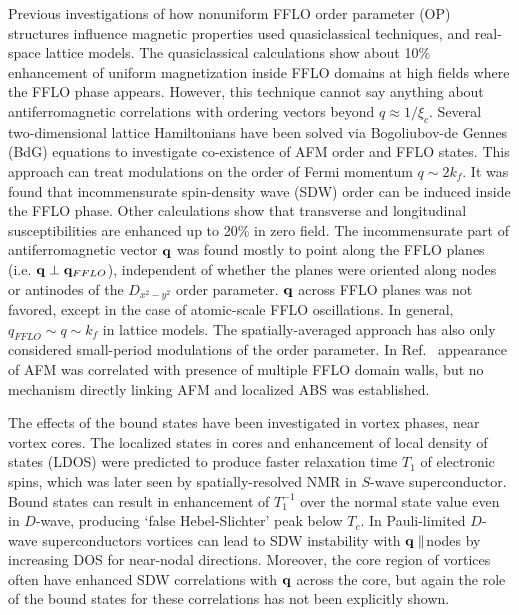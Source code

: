 \documentclass[prb,aps,showpacs,amsmath,twocolumn,10pt]{revtex4-1}
\begin{document}
Previous investigations of how nonuniform FFLO order parameter (OP) 
structures influence magnetic properties used quasiclassical techniques,
and real-space lattice models. 
The quasiclassical calculations\cite{Burkhardt1994,Vorontsov:2006fc} 
show about 10\% enhancement of uniform 
magnetization inside FFLO domains at high fields where the FFLO phase appears. 
However, this technique cannot say anything about antiferromagnetic correlations 
with ordering vectors beyond $q \approx 1/\xi_c$. 
Several two-dimensional lattice Hamiltonians have been solved via Bogoliubov-de Gennes (BdG) equations 
to investigate co-existence of AFM order and FFLO states.\cite{Yanase2009, Yanase2009abs, Marcin2009, Yanase2011} 
This approach can treat modulations on the order of Fermi momentum $q \sim 2k_f$. 
It was found that incommensurate spin-density wave (SDW) order
can be induced inside the FFLO phase.\cite{Yanase2009,Yanase2009abs} 
Other calculations show that transverse and longitudinal susceptibilities are enhanced up to 20\% in zero
field.\cite{Marcin2009}
The incommensurate part of antiferromagnetic vector ${\bf q}$ was found mostly to point along the FFLO
planes (i.e. ${\bf q} \perp {\bf q}_{FFLO}$),\cite{Yanase2009,Yanase2009abs} 
independent of whether the planes were oriented along nodes or
antinodes of the $D_{x^2-y^2}$ order parameter. 
${\bf q}$ across FFLO planes was not favored, except in the case of
atomic-scale {FFLO} oscillations.\cite{Marcin2009,Yanase2011}
In general, $q_{FFLO} \sim q \sim k_f$ in lattice models. 
The spatially-averaged approach\cite{Marcin2009} has also only considered
small-period modulations of the order parameter. 
In Ref.~ 
appearance of AFM was correlated with presence of multiple FFLO domain walls,
but no mechanism directly linking AFM and localized ABS was established. 

The effects of the bound states have been investigated in vortex phases,
near vortex cores. The localized states in cores and 
enhancement of local density of states (LDOS) were
predicted\cite{Takigawa1999} to produce faster relaxation time $T_1$ of
electronic spins, which was later seen by spatially-resolved NMR in $S$-wave superconductor.\cite{Nakai2008} 
Bound states can result in enhancement of $T_1^{-1}$ over the normal state
value even in $D$-wave,\cite{Tanaka2015} producing 
`false Hebel-Slichter' peak below $T_c$. 
In Pauli-limited $D$-wave superconductors vortices can lead to SDW instability with ${\bf q}
\parallel $nodes by increasing DOS for near-nodal directions.\cite{sdw_vortex}
Moreover, the core region of vortices often have enhanced SDW 
correlations\cite{Ogata1999,JXZhu2001,Ghosal2002} with ${\bf q}$ across the
core, but again the role of the 
bound states for these correlations has not been explicitly shown. 
\end{document}
